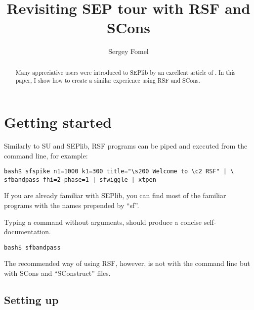 \title{Revisiting SEP tour with RSF and SCons}


\author{Sergey Fomel}



\maketitle

\begin{abstract}

Many appreciative users were introduced to SEPlib
\cite[]{Claerbout.sep.70.413} by an excellent article of
\cite{Dellinger.sep.73.461}. In this paper, I show how to create a similar
experience using RSF and SCons.

\end{abstract}

\section{Getting started}

Similarly to SU and SEPlib, RSF programs can be piped and executed from the
command line, for example:

\begin{verbatim}
bash$ sfspike n1=1000 k1=300 title="\s200 Welcome to \c2 RSF" | \
sfbandpass fhi=2 phase=1 | sfwiggle | xtpen
\end{verbatim}

If you are already familiar with SEPlib, you can find most of the familiar
programs with the names prepended by ``sf''.

Typing a command without arguments, should produce a concise
self-documentation. 

\begin{verbatim}
bash$ sfbandpass
\end{verbatim}

The recommended way of using RSF, however, is not with the command line but
with SCons and ``SConstruct'' files.

\subsection{Setting up}


